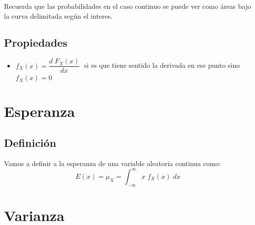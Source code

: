 \documentclass[12pt, fleqn]{report}                             %
\theoremstyle{break}                                            %
\newcommand \Derivate[2]          {\dfrac{d \; #1}{d #2}}       %
\begin{document}
                Recuerda que las probabilidades en el caso continuo se puede ver como áreas bajo la curva
                delimitada según el interes.


            \subsection{Propiedades}

                \begin{itemize}
                    \item
                        $f_X(x) = \Derivate{F_X(x)}{x} \;$ si es que tiene sentido la derivada en ese punto
                        sino $f_X(x) = 0$
                \end{itemize}


        \clearpage
        \section{Esperanza}

            \subsection{Definición}

                Vamos a definir a la esperanza de una variable aleatoria continua como:
                \begin{equation*}
                    E(x) = \mu_X = \int_{-\infty}^{\infty} x \; f_X (x) \; dx
                \end{equation*}


        \vspace{1em}
        \section{Varianza}
\end{document}
